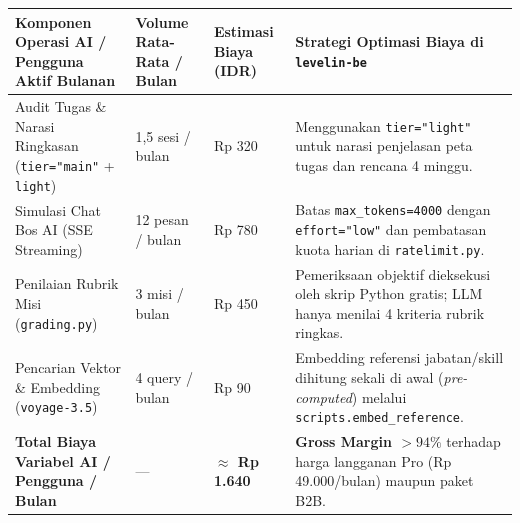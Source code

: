 \documentclass[11pt,a4paper]{report}
\begin{document}
\begin{tabularx}{\textwidth}{L{4.8cm} R{3.0cm} R{3.0cm} X}
\toprule
\textbf{Komponen Operasi AI / Pengguna Aktif Bulanan} & \textbf{Volume Rata-Rata / Bulan} & \textbf{Estimasi Biaya (IDR)} & \textbf{Strategi Optimasi Biaya di \texttt{levelin-be}} \\
\midrule
Audit Tugas \& Narasi Ringkasan (\texttt{tier="main"} + \texttt{light}) & 1,5 sesi / bulan & Rp 320 & Menggunakan \texttt{tier="light"} untuk narasi penjelasan peta tugas dan rencana 4 minggu. \\
Simulasi Chat Bos AI (SSE Streaming) & 12 pesan / bulan & Rp 780 & Batas \texttt{max\_tokens=4000} dengan \texttt{effort="low"} dan pembatasan kuota harian di \texttt{ratelimit.py}. \\
Penilaian Rubrik Misi (\texttt{grading.py}) & 3 misi / bulan & Rp 450 & Pemeriksaan objektif dieksekusi oleh skrip Python gratis; LLM hanya menilai 4 kriteria rubrik ringkas. \\
Pencarian Vektor \& Embedding (\texttt{voyage-3.5}) & 4 query / bulan & Rp 90 & Embedding referensi jabatan/skill dihitung sekali di awal (\textit{pre-computed}) melalui \texttt{scripts.embed\_reference}. \\
\midrule
\textbf{Total Biaya Variabel AI / Pengguna / Bulan} & --- & \textbf{$\approx$ Rp 1.640} & \textbf{Gross Margin $> 94\%$} terhadap harga langganan Pro (Rp 49.000/bulan) maupun paket B2B. \\
\bottomrule
\end{tabularx}
\end{document}
